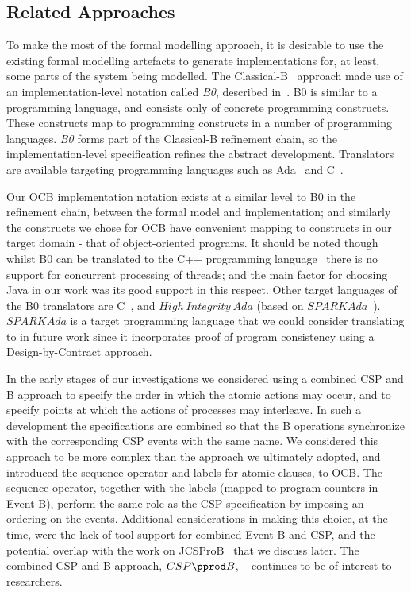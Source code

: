 \subsection{Related Approaches}
To make the most of the formal modelling approach, it is desirable to use the existing formal modelling artefacts to generate implementations for, at least, some parts of the system being modelled. The Classical-B~\cite{TheBBook} approach made use of an implementation-level notation called \emph{B0}, described in~\cite{B0RefMan}. B0 is similar to a programming language, and consists only of concrete programming constructs. These constructs map to programming constructs in a number of programming languages. \emph{B0} forms part of the Classical-B refinement chain, so the implementation-level specification refines the abstract development. Translators are available targeting programming languages such as Ada~\cite{ada2005} and C~\cite{KernighanR88}.

 Our OCB implementation notation exists at a similar level to B0 in the refinement chain, between the formal model and implementation; and similarly the constructs we chose for OCB have convenient mapping to constructs in our target domain - that of object-oriented programs. It should be noted though whilst B0 can be translated to the C++ programming language~\cite{stroustrup2000} there is no support for concurrent processing of threads; and the main factor for choosing Java in our work was its good support in this respect. Other target languages of the B0 translators are C~\cite{KernighanR88}, and $High~ Integrity~ Ada$ (based on $SPARKAda$~\cite{SPARKAda}). $SPARKAda$ is a target programming language that we could consider translating to in future work since it incorporates proof of program consistency using a Design-by-Contract approach.

In the early stages of our investigations we considered using a combined CSP and B approach to specify the order in which the atomic actions may occur, and to specify points at which the actions of processes may interleave. In such a development the specifications are combined so that the B operations synchronize with the corresponding CSP events with the same name. We considered this approach to be more complex than the approach we ultimately adopted, and introduced the sequence operator and labels for atomic clauses, to OCB. The sequence operator, together with the labels (mapped to program counters in Event-B), perform the same role as the CSP specification by imposing an ordering on the events. Additional considerations in making this choice, at the time, were the lack of tool support for combined Event-B and CSP, and the potential overlap with the work on JCSProB~\cite{YangPop2007} that we discuss later.  The combined CSP and B approach, $CSP\pprod B$, ~\cite{SchneiderT02, SchneiderT05} continues to be of interest to researchers. 

